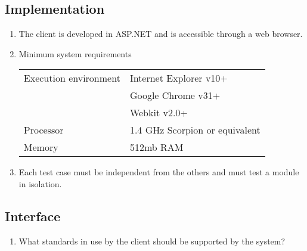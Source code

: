 \documentclass[../report.tex]{subfiles}
\begin{document}
\subsection{Implementation}
\begin{enumerate}[label=Im\arabic*:]
\item The client is developed in ASP.NET and is accessible through a web browser.
\item Minimum system requirements


\begin{tabular}{| l | l | }
\hline
 Execution environment & Internet Explorer v10+\\
& Google Chrome v31+\\
& Webkit v2.0+\\ \hline
 Processor & 1.4 GHz Scorpion or equivalent \\ \hline
 Memory & 512mb RAM  \\ \hline

\end{tabular}

\item Each test case must be independent from the others and must test a module in isolation.
\end{enumerate}

\subsection{Interface}

\begin{enumerate}[label=In\arabic*:]
\item {\color{red}What standards in use by the client should be supported by the system?}
\end{enumerate}
\end{document}
